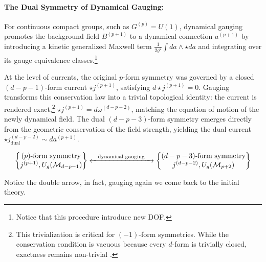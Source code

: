 \documentclass[aps,preprint,nofootinbib,preprintnumbers,eqsecnum,superscriptaddress]{revtex4}
\numberwithin{equation}{section}
\begin{document}
\paragraph*{The Dual Symmetry of Dynamical Gauging:} 
For continuous compact groups, such as $G^{(p)} = U(1)$, dynamical gauging promotes the background field $B^{(p+1)}$ to a dynamical connection $a^{(p+1)}$ by introducing a kinetic generalized Maxwell term $\frac{1}{2g^2}\int da\wedge \star da$ and integrating over its gauge equivalence classes.\footnote{Notice that this procedure introduce new DOF.}

At the level of currents, the original $p$-form symmetry was governed by a closed $(d-p-1)$-form current $\star j^{(p+1)}$, satisfying $d\star j^{(p+1)} = 0$. 
Gauging transforms this conservation law into a trivial topological identity: the current is rendered exact,\footnote{This trivialization is critical for $(-1)$-form symmetries. While the conservation condition is vacuous because every $d$-form is trivially closed, exactness remains non-trivial \cite{Heidenreich_2021}.} $\star j^{(p+1)} = d\omega^{(d-p-2)}$, matching the equation of motion of the newly dynamical field. The dual $(d-p-3)$-form symmetry emerges directly from the geometric conservation of the field strength, yielding the dual current $\star j^{(d-p-2)}_{\text{dual}} \sim da^{(p+1)}$.

\begin{align}
    \left\{ \begin{matrix} 
    (p)\text{-form symmetry} \\ 
    j^{(p+1)}, U_g(\mathcal{M}_{d-p-1})
    \end{matrix} \right\} 
 \xleftrightarrow{\text{\quad dynamical gauging \quad}}
\left\{ \begin{matrix} 
    (d-p-3)\text{-form symmetry} \\ 
    j^{(d-p-2)}, U_g(\mathcal{M}_{p+2})
    \end{matrix} \right\} 
\end{align}

Notice the double arrow, in fact, gauging again we come back to the initial theory.
\end{document}
